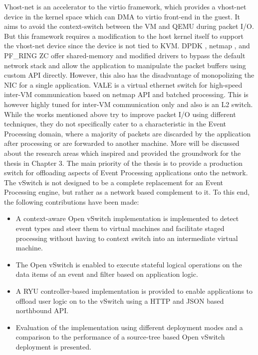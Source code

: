 Vhost-net is an accelerator to the virtio framework, which provides a vhost-net device in the kernel space which can DMA to virtio front-end in the guest. It aims to avoid the context-switch between the VM and QEMU during packet I/O. But this framework requires a modification to the host kernel itself to support the vhost-net device since the device is not tied to KVM.  DPDK \citep{scholz2014look}, netmap \cite{rizzo2012netmap}, and PF_RING ZC \cite{kim2017study} offer shared-memory and modified drivers to bypass the default network stack and allow the application to manipulate the packet buffers using custom API directly. However, this also has the disadvantage of monopolizing the NIC for a single application. VALE \cite{Rizzo:2012:VSE:2413176.2413185} is a virtual ethernet switch for high-speed inter-VM communication based on netmap API and batched processing. This is however highly tuned for inter-VM communication only and also is an L2 switch. While the works mentioned above try to improve packet I/O using different techniques, they do not specifically cater to a characteristic in the Event Processing domain, where a majority of packets are discarded by the application after processing or are forwarded to another machine. More will be discussed about the research areas which inspired and provided the groundwork for the thesis in Chapter 3.
\newline \newline
The main priority of the thesis is to provide a production switch for offloading aspects of Event Processing applications onto the network. The vSwitch is not designed to be a complete replacement for an Event Processing engine, but rather as a network based complement to it. To this end, the following contributions have been made:
\begin{itemize}
 \item A context-aware Open vSwitch implementation is implemented to detect event types and steer them to virtual machines and facilitate staged processing without having to context switch into an intermediate virtual machine.
 \item The Open vSwitch is enabled to execute stateful logical operations on the data items of an event and filter based on application logic. 
 \item A RYU controller-based implementation is provided to enable applications to offload user logic on to the vSwitch using a HTTP and JSON based northbound API.
 \item Evaluation of the implementation using different deployment modes and a comparison to the performance of a source-tree based Open vSwitch deployment is presented.
\end{itemize} 


